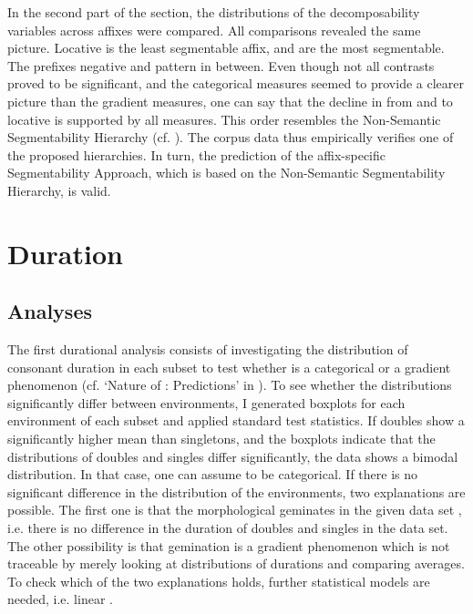  In the second part of the section, the distributions of the decomposability variables across affixes were compared. All comparisons revealed the same picture. Locative  is the least segmentable affix,  and  are the most segmentable. The prefixes negative  and  pattern in between. 
 Even though not all contrasts proved to be significant, and the categorical measures seemed to provide a clearer picture than the gradient measures, one can say that the decline in  from  and  to locative  is supported by all measures. 
 This order resembles the Non-Semantic Segmentability Hierarchy (cf.  ). The corpus data thus empirically verifies one of the proposed  hierarchies. In turn, the  prediction of the affix-specific Segmentability Approach, which is based on the Non-Semantic Segmentability Hierarchy, is valid. 

\section{Duration}


\subsection{Analyses} \label{analyses dur corpus}


The first durational analysis consists of investigating the distribution of consonant duration in each subset to test whether  is a categorical or a gradient phenomenon (cf. `Nature of : Predictions' in ). To see whether the distributions significantly differ between environments, I generated boxplots for each environment of each subset and applied standard test statistics. 
If doubles show a significantly higher mean than singletons, and the boxplots indicate that the distributions of doubles and singles differ significantly, the data shows a bimodal distribution. In that case, one can assume  to be categorical. 
If there is no significant difference in the distribution of the environments, two explanations are possible. The first one is that the morphological geminates in the given data set , i.e. there is no difference in the duration of doubles and singles in the data set. The other possibility is that {gemination} is a gradient phenomenon which is not traceable by merely looking at distributions of durations and comparing averages. To check which of the two explanations holds, further statistical models are needed, i.e. linear . 



